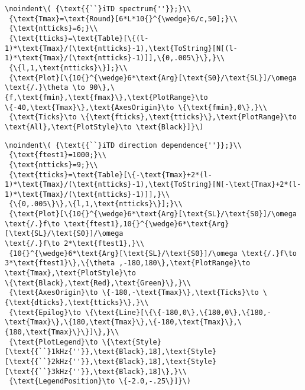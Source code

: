\begin{appendix}
\begin{verbatim}
\noindent\( {\text{{``}iTD spectrum{''}};}\\
 {\text{Tmax}=\text{Round}[6*L*10{}^{\wedge}6/c,50];}\\
 {\text{ntticks}=6;}\\
 {\text{tticks}=\text{Table}[\{(l-1)*\text{Tmax}/(\text{ntticks}-1),\text{ToString}[N[(l-1)*\text{Tmax}/(\text{ntticks}-1)]],\{0,.005\}\},}\\
 {\{l,1,\text{ntticks}\}];}\\
 {\text{Plot}[\{10{}^{\wedge}6*\text{Arg}[\text{S0}/\text{SL}]/\omega \text{/.}\theta \to 90\},\{f,\text{fmin},\text{fmax}\},\text{PlotRange}\to
\{-40,\text{Tmax}\},\text{AxesOrigin}\to \{\text{fmin},0\},}\\
 {\text{Ticks}\to \{\text{fticks},\text{tticks}\},\text{PlotRange}\to \text{All},\text{PlotStyle}\to \text{Black}]}\)
\end{verbatim}

\begin{verbatim}
\noindent\( {\text{{``}iTD direction dependence{''}};}\\
 {\text{ftest1}=1000;}\\
 {\text{ntticks}=9;}\\
 {\text{tticks}=\text{Table}[\{-\text{Tmax}+2*(l-1)*\text{Tmax}/(\text{ntticks}-1),\text{ToString}[N[-\text{Tmax}+2*(l-1)*\text{Tmax}/(\text{ntticks}-1)]],}\\
 {\{0,.005\}\},\{l,1,\text{ntticks}\}];}\\
 {\text{Plot}[\{10{}^{\wedge}6*\text{Arg}[\text{SL}/\text{S0}]/\omega \text{/.}f\to \text{ftest1},10{}^{\wedge}6*\text{Arg}[\text{SL}/\text{S0}]/\omega
\text{/.}f\to 2*\text{ftest1},}\\
 {10{}^{\wedge}6*\text{Arg}[\text{SL}/\text{S0}]/\omega \text{/.}f\to 3*\text{ftest1}\},\{\theta ,-180,180\},\text{PlotRange}\to \text{Tmax},\text{PlotStyle}\to
\{\text{Black},\text{Red},\text{Green}\},}\\
 {\text{AxesOrigin}\to \{-180,-\text{Tmax}\},\text{Ticks}\to \{\text{dticks},\text{tticks}\},}\\
 {\text{Epilog}\to \{\text{Line}[\{\{-180,0\},\{180,0\},\{180,-\text{Tmax}\},\{180,\text{Tmax}\},\{-180,\text{Tmax}\},\{180,\text{Tmax}\}\}]\},}\\
 {\text{PlotLegend}\to \{\text{Style}[\text{{``}1kHz{''}},\text{Black},18],\text{Style}[\text{{``}2kHz{''}},\text{Black},18],\text{Style}[\text{{``}3kHz{''}},\text{Black},18]\},}\\
 {\text{LegendPosition}\to \{-2.0,-.25\}]}\)
\end{verbatim}


\end{appendix}

